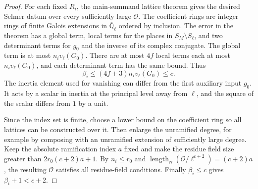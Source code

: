 \begin{proof}
For each fixed $R_i$, the main-summand lattice theorem gives the desired Selmer datum over every sufficiently large $\mathcal O$. The coefficient rings are integer rings of finite Galois extensions in $\overline{\mathbb Q}_\ell$ ordered by inclusion. The error in the theorem has a global term, local terms for the places in $S_M\setminus S_\ell$, and two determinant terms for $g_0$ and the inverse of its complex conjugate.
The global term is at most $n_i v_\ell(G_0)$. There are at most $4f$ local terms each at most $n_i v_\ell(G_0)$, and each determinant term has the same bound. Thus
\[
 \beta_i\le (4f+3)n_i v_\ell(G_0)\le c .
\]
The inertia element used for vanishing can differ from the first auxiliary input $g_0$. It acts by a scalar in inertia at the principal level away from $\ell$, and the square of the scalar differs from $1$ by a unit.

Since the index set is finite, choose a lower bound on the coefficient ring so all lattices can be constructed over it. Then enlarge the unramified degree, for example by composing with an unramified extension of sufficiently large degree. Keep the absolute ramification index $a$ fixed and make the residue field size greater than $2r_0(c+2)a+1$. By $n_i\le r_0$ and
$\operatorname{length}_{\mathcal O}(\mathcal O/\ell^{c+2})=(c+2)a$, the resulting $\mathcal O$ satisfies all residue-field conditions. Finally $\beta_i\le c$ gives $\beta_i+1<c+2$.
\end{proof}

